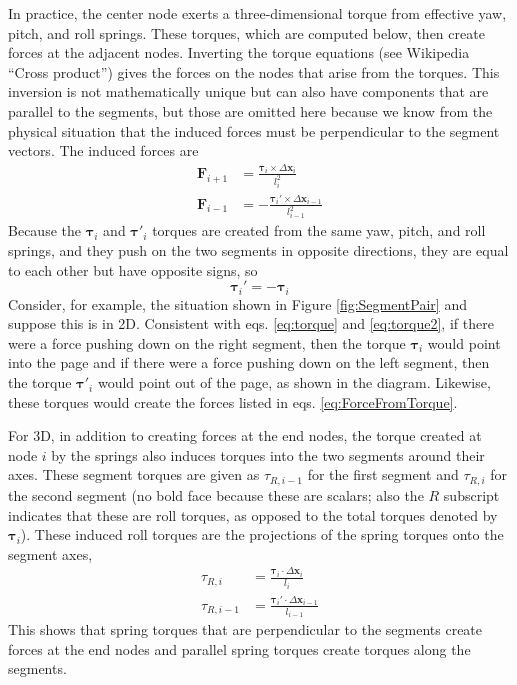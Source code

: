 \documentclass {scrbook}
\begin{document}
In practice, the center node exerts a three-dimensional torque from effective yaw, pitch, and roll springs. These torques, which are computed below, then create forces at the adjacent nodes. Inverting the torque equations (see Wikipedia ``Cross product'') gives the forces on the nodes that arise from the torques. This inversion is not mathematically unique but can also have components that are parallel to the segments, but those are omitted here because we know from the physical situation that the induced forces must be perpendicular to the segment vectors. The induced forces are
\begin{align}
\bm{F}_{i+1} &= \frac{\bm{\tau}_{i} \times \Delta \bm{x}_i}{l_i^2} \nonumber \\
\bm{F}_{i-1} &= - \frac{\bm{\tau}_{i}' \times \Delta \bm{x}_{i-1}}{l_{i-1}^2}
\label{eq:ForceFromTorque}
\end{align}
Because the $\bm{\tau}_i$ and $\bm{\tau}'_i$ torques are created from the same yaw, pitch, and roll springs, and they push on the two segments in opposite directions, they are equal to each other but have opposite signs, so
$$\bm{\tau}_i' = -\bm{\tau}_i$$
Consider, for example, the situation shown in Figure \ref{fig:SegmentPair} and suppose this is in 2D. Consistent with eqs. \ref{eq:torque} and \ref{eq:torque2}, if there were a force pushing down on the right segment, then the torque $\bm{\tau}_i$ would point into the page and if there were a force pushing down on the left segment, then the torque $\bm{\tau}'_i$ would point out of the page, as shown in the diagram. Likewise, these torques would create the forces listed in eqs. \ref{eq:ForceFromTorque}.

For 3D, in addition to creating forces at the end nodes, the torque created at node $i$ by the springs also induces torques into the two segments around their axes. These segment torques are given as $\tau_{R,i-1}$ for the first segment and $\tau_{R,i}$ for the second segment (no bold face because these are scalars; also the $R$ subscript indicates that these are roll torques, as opposed to the total torques denoted by $\bm{\tau}_i$). These induced roll torques are the projections of the spring torques onto the segment axes,
\begin{align}
\tau_{R,i} &= \frac{\bm{\tau}_i \cdot \Delta \bm{x}_i}{l_i} \nonumber \\
\tau_{R,i-1} &= \frac{\bm{\tau}_i' \cdot \Delta \bm{x}_{i-1}}{l_{i-1}}
\end{align}
This shows that spring torques that are perpendicular to the segments create forces at the end nodes and parallel spring torques create torques along the segments.
\end{document}
